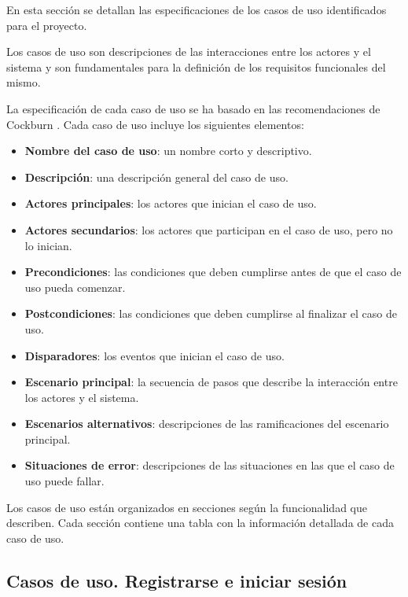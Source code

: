 En esta sección se detallan las especificaciones de los casos de uso identificados para el proyecto. 

Los casos de uso son descripciones de las interacciones entre los actores y el sistema y son fundamentales para la definición de los requisitos funcionales del mismo.

La especificación de cada caso de uso se ha basado en las recomendaciones de Cockburn \cite{cockburn2000writing}. Cada caso de uso incluye los siguientes elementos:
\begin{itemize}
    \item \textbf{Nombre del caso de uso}: un nombre corto y descriptivo.
    \item \textbf{Descripción}: una descripción general del caso de uso.
    \item \textbf{Actores principales}: los actores que inician el caso de uso.
    \item \textbf{Actores secundarios}: los actores que participan en el caso de uso, pero no lo inician.
    \item \textbf{Precondiciones}: las condiciones que deben cumplirse antes de que el caso de uso pueda comenzar.
    \item \textbf{Postcondiciones}: las condiciones que deben cumplirse al finalizar el caso de uso.
    \item \textbf{Disparadores}: los eventos que inician el caso de uso.
    \item \textbf{Escenario principal}: la secuencia de pasos que describe la interacción entre los actores y el sistema.
    \item \textbf{Escenarios alternativos}: descripciones de las ramificaciones del escenario principal.
    \item \textbf{Situaciones de error}: descripciones de las situaciones en las que el caso de uso puede fallar.
\end{itemize}


Los casos de uso están organizados en secciones según la funcionalidad que describen. Cada sección contiene una tabla con la información detallada de cada caso de uso.


\subsection{Casos de uso. Registrarse e iniciar sesión}


